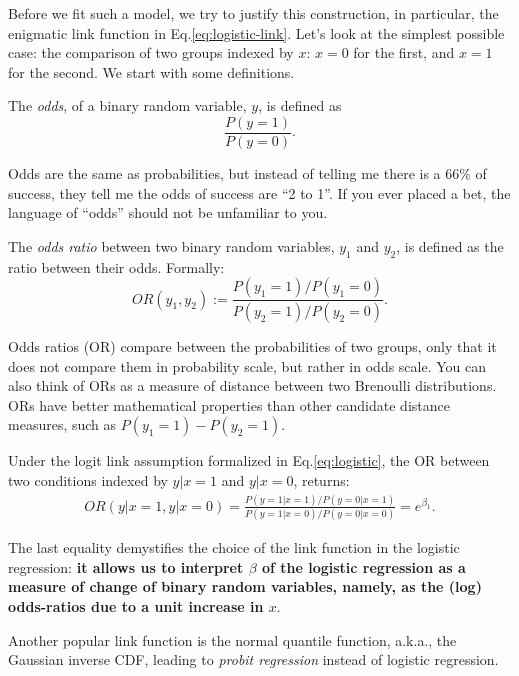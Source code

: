 \documentclass[]{book}
\theoremstyle{definition}
\theoremstyle{definition}
\theoremstyle{definition}
\theoremstyle{remark}
\let\BeginKnitrBlock\begin \let\EndKnitrBlock\end
\begin{document}
Before we fit such a model, we try to justify this construction, in particular, the enigmatic link function in Eq.\eqref{eq:logistic-link}.
Let's look at the simplest possible case: the comparison of two groups indexed by \(x\): \(x=0\) for the first, and \(x=1\) for the second.
We start with some definitions.

\BeginKnitrBlock{definition}[Odds]
\protect\hypertarget{def:unnamed-chunk-182}{}{\label{def:unnamed-chunk-182} {} }The \emph{odds}, of a binary random variable, \(y\), is defined as \[\frac{P(y=1)}{P(y=0)}.\]
\EndKnitrBlock{definition}

Odds are the same as probabilities, but instead of telling me there is a \(66\%\) of success, they tell me the odds of success are ``2 to 1''.
If you ever placed a bet, the language of ``odds'' should not be unfamiliar to you.

\BeginKnitrBlock{definition}[Odds Ratio]
\protect\hypertarget{def:unnamed-chunk-183}{}{\label{def:unnamed-chunk-183} {} }The \emph{odds ratio} between two binary random variables, \(y_1\) and \(y_2\), is defined as the ratio between their odds.
Formally:
\[OR(y_1,y_2):=\frac{P(y_1=1)/P(y_1=0)}{P(y_2=1)/P(y_2=0)}.\]
\EndKnitrBlock{definition}

Odds ratios (OR) compare between the probabilities of two groups, only that it does not compare them in probability scale, but rather in odds scale.
You can also think of ORs as a measure of distance between two Brenoulli distributions.
ORs have better mathematical properties than other candidate distance measures, such as \(P(y_1=1)-P(y_2=1)\).

Under the logit link assumption formalized in Eq.\eqref{eq:logistic}, the OR between two conditions indexed by \(y|x=1\) and \(y|x=0\), returns:
\begin{align}
   OR(y|x=1,y|x=0) 
   = \frac{P(y=1|x=1)/P(y=0|x=1)}{P(y=1|x=0)/P(y=0|x=0)} 
   = e^{\beta_1}.  
\end{align}

The last equality demystifies the choice of the link function in the logistic regression: \textbf{it allows us to interpret \(\beta\) of the logistic regression as a measure of change of binary random variables, namely, as the (log) odds-ratios due to a unit increase in \(x\)}.

\BeginKnitrBlock{remark}
{}Another popular link function is the normal quantile function, a.k.a., the Gaussian inverse CDF, leading to \emph{probit regression} instead of logistic regression.
\EndKnitrBlock{remark}
\end{document}
